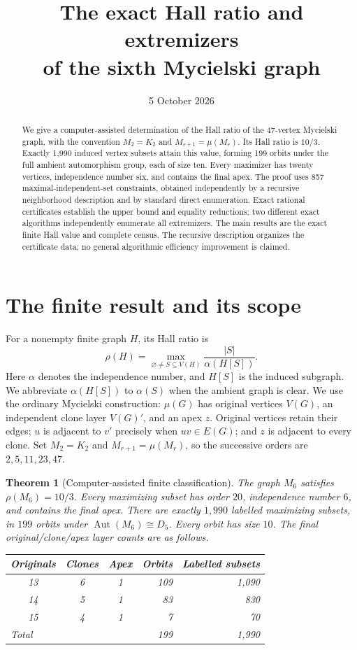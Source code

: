 \documentclass[11pt,letterpaper]{article}
\title{The exact Hall ratio and extremizers\\
of the sixth Mycielski graph}
\author{}
\date{5 October 2026}
\newtheorem{theorem}{Theorem}[section]
\theoremstyle{remark}
\DeclareMathOperator{\Aut}{Aut}
\newcommand{\abs}[1]{\lvert #1\rvert}
\begin{document}
\maketitle
\vspace{-1.5em}
\begin{abstract}
We give a computer-assisted determination of the Hall ratio of the
47-vertex Mycielski graph, with the convention $M_2=K_2$ and
$M_{r+1}=\mu(M_r)$. Its Hall ratio is $10/3$. Exactly 1,990 induced vertex
subsets attain this value, forming 199 orbits under the full ambient
automorphism group, each of size ten. Every maximizer has twenty vertices,
independence number six, and contains the final apex. The proof uses 857
maximal-independent-set constraints, obtained independently by a recursive
neighborhood description and by standard direct enumeration. Exact
rational certificates establish the upper bound and equality reductions;
two different exact algorithms independently enumerate all extremizers.
The main results are the exact finite Hall value and complete census.
The recursive description organizes the certificate data; no general
algorithmic efficiency improvement is claimed.
\end{abstract}

\section{The finite result and its scope}
For a nonempty finite graph $H$, its Hall ratio is
\[
 \rho(H)=\max_{\varnothing\ne S\subseteq V(H)}
 \frac{\abs S}{\alpha(H[S])}.
\]
Here $\alpha$ denotes the independence number, and $H[S]$ is the induced
subgraph. We abbreviate $\alpha(H[S])$ to $\alpha(S)$ when the ambient graph
is clear. We use the ordinary Mycielski construction: $\mu(G)$ has original
vertices $V(G)$, an independent clone layer $V(G)'$, and an apex $z$.
Original vertices retain their edges; $u$ is adjacent to $v'$ precisely
when $uv\in E(G)$; and $z$ is adjacent to every clone. Set $M_2=K_2$ and
$M_{r+1}=\mu(M_r)$, so the successive orders are $2,5,11,23,47$.

\begin{theorem}[Computer-assisted finite classification]\label{thm:main}
The graph $M_6$ satisfies $\rho(M_6)=10/3$. Every maximizing subset has
order $20$, independence number $6$, and contains the final apex.
There are exactly $1,990$ labelled maximizing subsets, in $199$ orbits
under $\Aut(M_6)\cong D_5$. Every orbit has size $10$. The final
original/clone/apex layer counts are as follows.
\begin{center}
\begin{tabular}{@{}ccc rr@{}}
\toprule
Originals & Clones & Apex & Orbits & Labelled subsets\\
\midrule
13 & 6 & 1 & 109 & 1,090\\
14 & 5 & 1 & 83 & 830\\
15 & 4 & 1 & 7 & 70\\
\midrule
\multicolumn{3}{l}{Total} & 199 & 1,990\\
\bottomrule
\end{tabular}
\end{center}
\end{theorem}
\end{document}
